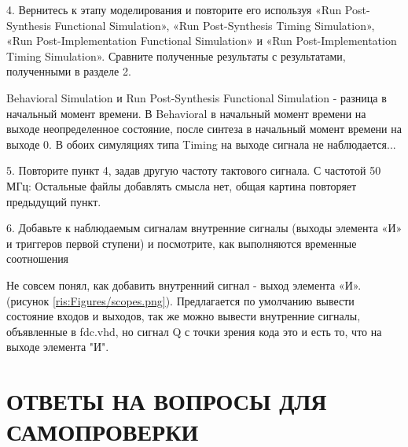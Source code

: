 \begin{sloppypar}
4. Вернитесь к этапу моделирования и повторите его используя «Run Post-Synthesis Functional Simulation», «Run Post-Synthesis Timing Simulation», «Run Post-Implementation Functional Simulation» и «Run Post-Implementation Timing Simulation». Сравните полученные результаты с результатами, полученными в разделе 2.


Behavioral Simulation и Run Post-Synthesis Functional Simulation - разница в начальный момент времени. В Behavioral в начальный момент времени на выходе  неопределенное состояние, после синтеза в начальный момент времени на выходе 0. В обоих симуляциях типа Timing на выходе сигнала не наблюдается...

5. Повторите пункт 4, задав другую частоту тактового сигнала.
С частотой 50 МГц: 
Остальные файлы добавлять смысла нет, общая картина повторяет предыдущий пункт.

6. Добавьте к наблюдаемым сигналам внутренние сигналы (выходы элемента «И» и триггеров первой ступени) и посмотрите, как выполняются временные соотношения

Не совсем понял, как добавить  внутренний сигнал - выход элемента «И». (рисунок \ref{ris:Figures/scopes.png}). Предлагается по умолчанию вывести состояние входов и выходов, так же можно вывести внутренние сигналы, объявленные в fdc.vhd, но сигнал Q с точки зрения кода это и есть то, что на выходе элемента "И". 





\section*{ОТВЕТЫ НА ВОПРОСЫ ДЛЯ САМОПРОВЕРКИ}


\end{sloppypar}
